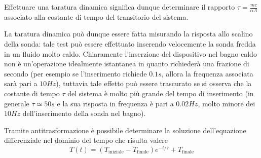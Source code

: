 		Effettuare una taratura dinamica significa dunque determinare il rapporto $\tau = \frac {mc}{\alpha A}$ associato alla costante di tempo del transitorio del sistema.
		
		\vspace{3mm}
		
		La taratura dinamica può dunque essere fatta misurando la risposta allo scalino della sonda: tale test può essere effettuato inserendo velocemente la sonda fredda in un fluido molto caldo. Chiaramente l'inserzione del dispositivo nel bagno caldo non è un'operazione idealmente istantanea in quanto richiederà una frazione di secondo (per esempio se l'inserimento richiede $0.1s$, allora la frequenza associata sarà pari a $10Hz$), tuttavia tale effetto può essere trascurato se si osserva che la costante di tempo $\tau$ del sistema è molto più grande del tempo di inserimento (in generale $\tau \simeq 50s$ e la sua risposta in frequenza è pari a $0.02Hz$, molto minore dei $10Hz$ dell'inserimento della sonda nel bagno).
		
		\vspace{3mm}
		
		Tramite antitrasformazione è possibile determinare la soluzione dell'equazione differenziale nel dominio del tempo che risulta valere
		\begin{equation} \label{eq:td:pt100}
			T(t) = \left(T_\textrm{iniziale} - T_\textrm{finale}\right)e^{-t/\tau} + T_\textrm{finale}
		\end{equation}
	
